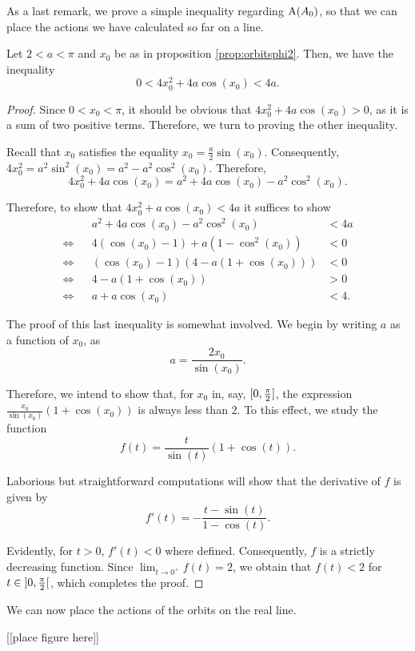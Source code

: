 As a last remark, we prove a simple inequality regarding $\AA(A_0)$, so that we can place the actions we have calculated so far on a line.

\begin{prop}
Let $2 < a < \pi$ and $x_0$ be as in proposition \ref{prop:orbitsphi2}. Then, we have the inequality
\begin{equation}
0 < 4 x_0^2 + 4 a \cos(x_0) < 4a.
\end{equation}
\end{prop}

\begin{proof}
Since $0 < x_0 < \pi$, it should be obvious that $4 x_0^2 + 4 a \cos(x_0) > 0$, as it is a sum of two positive terms. Therefore, we turn to proving the other inequality.

Recall that $x_0$ satisfies the equality $x_0 = \frac a 2 \sin(x_0)$. Consequently, $4 x_0^2 = a^2 \sin^2 (x_0) = a^2 - a^2 \cos^2(x_0)$. Therefore,
\begin{equation}
4 x_0^2 + 4 a \cos(x_0) = a^2 + 4 a \cos(x_0) - a^2 \cos^2(x_0).
\end{equation}

Therefore, to show that $4 x_0^2 + a \cos(x_0) < 4a$ it suffices to show
\begin{equation}
\begin{aligned}
&& a^2 + 4 a \cos(x_0) - a^2 \cos^2(x_0) &< 4a\\
\iff&& 4 (\cos(x_0)-1) + a(1 - \cos^2(x_0)) &< 0\\
\iff&& (\cos(x_0) - 1)(4 - a(1 + \cos(x_0))) &< 0\\
\iff&& 4 - a(1+ \cos(x_0)) &> 0\\
\iff&& a + a \cos(x_0) &< 4.
\end{aligned}
\end{equation}

The proof of this last inequality is somewhat involved. We begin by writing $a$ as a function of $x_0$, as
\begin{equation}
a = \frac{2 x_0}{\sin(x_0)}.
\end{equation}

Therefore, we intend to show that, for $x_0$ in, say, $\interval 0 {\frac \pi 2}$, the expression $\frac{x_0}{\sin(x_0)}(1 + \cos(x_0))$ is always less than 2. To this effect, we study the function
\begin{equation}
f(t) = \frac{t}{\sin(t)}(1 + \cos(t)).
\end{equation}

Laborious but straightforward computations will show that the derivative of $f$ is given by
\begin{equation}
f'(t) = - \frac{t - \sin(t)}{1 - \cos(t)}.
\end{equation}

Evidently, for $t > 0$, $f'(t) < 0$ where defined. Consequently, $f$ is a strictly decreasing function. Since $\lim_{t \to 0^+} f(t) = 2$, we obtain that $f(t) < 2$ for $t \in \ointerval 0 {\frac \pi 2}$, which completes the proof.
\end{proof}

We can now place the actions of the orbits on the real line.

[[place figure here]]